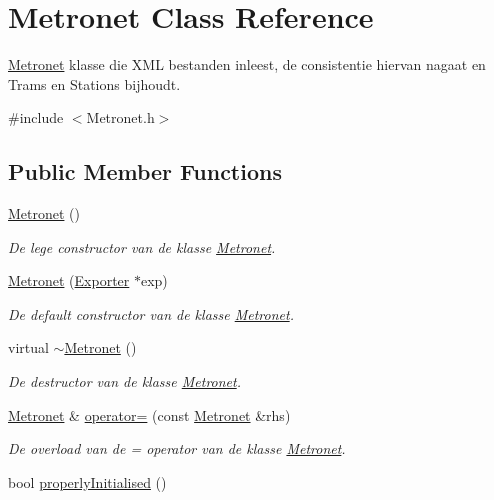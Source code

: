 \hypertarget{class_metronet}{}\section{Metronet Class Reference}
\label{class_metronet}


\hyperlink{class_metronet}{Metronet} klasse die X\+ML bestanden inleest, de consistentie hiervan nagaat en Trams en Stations bijhoudt.  




{\ttfamily \#include $<$Metronet.\+h$>$}

\subsection*{Public Member Functions}
\begin{DoxyCompactItemize}
\item 
\hyperlink{class_metronet_abdd205c39857ed1aabd104a6886cad45}{Metronet} ()
\begin{DoxyCompactList}\small\item\em De lege constructor van de klasse \hyperlink{class_metronet}{Metronet}. \end{DoxyCompactList}\item 
\hyperlink{class_metronet_a2f8f40f437a1ae14ea78d306aaed6bd4}{Metronet} (\hyperlink{class_exporter}{Exporter} $\ast$exp)
\begin{DoxyCompactList}\small\item\em De default constructor van de klasse \hyperlink{class_metronet}{Metronet}. \end{DoxyCompactList}\item 
virtual \hyperlink{class_metronet_afa96be4bf66f8d7dcf3f40a7487d2ea7}{$\sim$\+Metronet} ()
\begin{DoxyCompactList}\small\item\em De destructor van de klasse \hyperlink{class_metronet}{Metronet}. \end{DoxyCompactList}\item 
\hyperlink{class_metronet}{Metronet} \& \hyperlink{class_metronet_a116ec9674637a45ff59cbb2cebb8dd21}{operator=} (const \hyperlink{class_metronet}{Metronet} \&rhs)
\begin{DoxyCompactList}\small\item\em De overload van de = operator van de klasse \hyperlink{class_metronet}{Metronet}. \end{DoxyCompactList}\item 
bool \hyperlink{class_metronet_a3d2adce29a947f162924279b766de645}{properly\+Initialised} ()

\end{DoxyCompactItemize}
